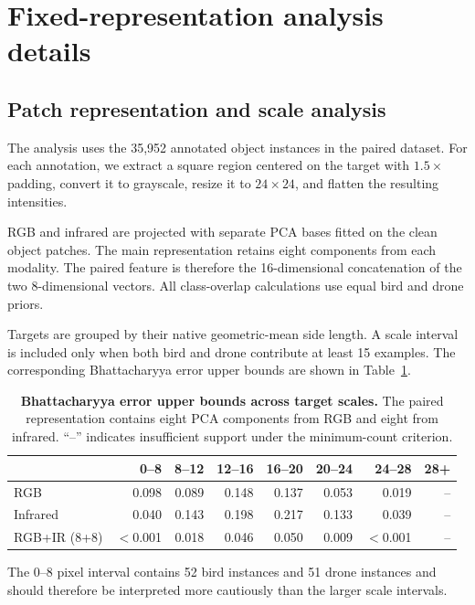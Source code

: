\documentclass[10pt]{article}
\begin{document}
\section{Fixed-representation analysis details}
\label{app:intrinsic}

\subsection{Patch representation and scale analysis}

The analysis uses the 35,952 annotated object instances in the paired dataset. For each annotation, we extract a square region centered on the target with $1.5\times$ padding, convert it to grayscale, resize it to $24\times24$, and flatten the resulting intensities.

RGB and infrared are projected with separate PCA bases fitted on the clean object patches. The main representation retains eight components from each modality. The paired feature is therefore the 16-dimensional concatenation of the two 8-dimensional vectors. All class-overlap calculations use equal bird and drone priors.

Targets are grouped by their native geometric-mean side length. A scale interval is included only when both bird and drone contribute at least 15 examples. The corresponding Bhattacharyya error upper bounds are shown in Table~\ref{tab:scalebounds}.

\begin{table}[h]
\centering
\caption{\textbf{Bhattacharyya error upper bounds across target scales.}
The paired representation contains eight PCA components from RGB and eight from infrared. ``--'' indicates insufficient support under the minimum-count criterion.}
\label{tab:scalebounds}
\small
\begin{tabular}{lrrrrrrr}
\toprule
& 0--8 & 8--12 & 12--16 & 16--20 & 20--24 & 24--28 & 28+ \\
\midrule
RGB
& 0.098 & 0.089 & 0.148 & 0.137 & 0.053 & 0.019 & -- \\
Infrared
& 0.040 & 0.143 & 0.198 & 0.217 & 0.133 & 0.039 & -- \\
RGB+IR (8+8)
& $<$0.001 & 0.018 & 0.046 & 0.050 & 0.009 & $<$0.001 & -- \\
\bottomrule
\end{tabular}
\end{table}

The 0--8 pixel interval contains 52 bird instances and 51 drone instances and should therefore be interpreted more cautiously than the larger scale intervals.
\end{document}
